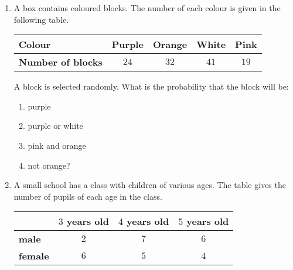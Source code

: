 \begin{exercises}{}
{
\begin{enumerate}[itemsep=6pt, label=\textbf{\arabic*}. ] 
  \item A box contains coloured blocks. The number of each colour is
    given in the following table.
    \begin{center}
      \begin{tabular}{|l|c|c|c|c|}
        \hline
        \textbf{Colour} & Purple & Orange & White & Pink \\ \hline
        \textbf{Number of blocks} & $24$ & $32$ & $41$ & $19$ \\ \hline
      \end{tabular}
    \end{center}
   A block is selected randomly. What is the probability that the block will be:
  \begin{enumerate}[noitemsep, label=\textbf{(\alph*)} ]
    \item purple
    \item purple or white
    \item pink and orange
    \item not orange?
    \end{enumerate}
  \item A small school has a class with children of various ages. The
    table gives the number of pupils of each age in the class.
    \begin{center}
      \begin{tabular}{|l|c|c|c|}
        \hline
               & $3$ years old & $4$ years old & $5$ years old \\\hline
        \textbf{male}   & $2$ & $7$ & $6$ \\\hline
        \textbf{female} & $6$ & $5$ & $4$ \\\hline

\end{tabular}
\end{center}
\end{enumerate}}
\end{exercises}
